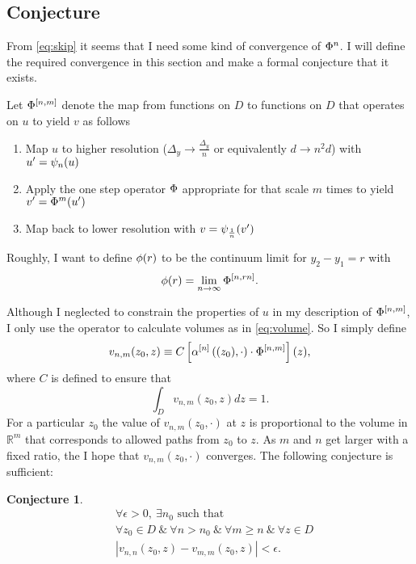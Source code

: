 \documentclass[twocolumn]{article}
\newcommand{\field}[1]{\mathbb{#1}}
\newcommand\REAL{\field{R}}
\newtheorem{conj}{Conjecture}
\begin{document}
\subsection{Conjecture}
\label{sec:conjecture}

From \eqref{eq:skip} it seems that I need some kind of convergence of
$\Phi^n$.  I will define the required convergence in this section and
make a formal conjecture that it exists.

Let $\Phi^{[n,m]}$ denote the map from functions on $D$ to
functions on $D$ that operates on $u$ to yield $v$ as follows
\begin{enumerate}
\item Map $u$ to higher resolution ($\Delta_y \rightarrow
\frac{\Delta_y}{n}$ or equivalently $d \rightarrow n^2 d$) with
$u' = \psi_{n}(u)$
\item Apply the one step operator $\Phi$ appropriate for that scale
  $m$ times to yield $v' = \Phi^m(u')$
\item Map back to lower resolution with $v = \psi_{\frac{1}{n}}(v')$
\end{enumerate}

Roughly, I want to define $\phi(r)$ to be the continuum limit for
$y_2 - y_1 =r$ with
\begin{equation}
  \label{eq:phir}
  \phi(r) = \lim_{n \rightarrow \infty} \Phi^{[n,rn]}.
\end{equation}

Although I neglected to constrain the properties of $u$ in my
description of $\Phi^{[n,m]}$, I only use the operator to
calculate volumes as in \eqref{eq:volume}.  So I simply define
\begin{equation}
  \label{eq:def}
  v_{n,m}(z_0,z) \equiv C \left[
    \alpha^{[n]} \left( (z_0), \cdot \right)
    \cdot \Phi^{[n,m]}
  \right](z),
\end{equation}
where $C$ is defined to ensure that
\begin{equation*}
  \int_D v_{n,m}(z_0,z) dz = 1.
\end{equation*}
For a particular $z_0$ the value of $v_{n,m}(z_0,\cdot)$ at $z$ is
proportional to the volume in $\REAL^m$ that corresponds to allowed
paths from $z_0$ to $z$.  As $m$ and $n$ get larger with a fixed
ratio, the I hope that $v_{n,m}(z_0,\cdot)$ converges.  The following
conjecture is sufficient:
\begin{conj}
  \label{conj}
  \begin{align*}
    & \forall \epsilon > 0,~ \exists n_0 \text{ such that } \\
    & \forall z_0 \in D ~\&~ \forall n > n_0 ~\&~ \forall m \geq n ~\&~
              \forall z \in D\\
    & \left| v_{n,n}(z_0,z) - v_{m,m}(z_0,z) \right| < \epsilon.
  \end{align*}
\end{conj}
\end{document}
